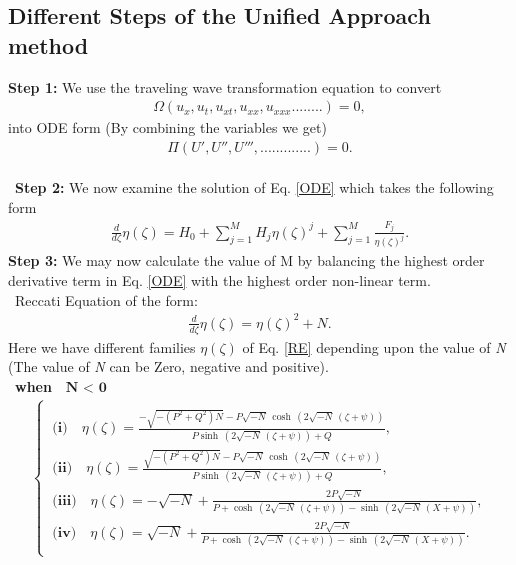 \documentclass{article}
\numberwithin{equation}{section}
\begin{document}
\subsection{Different Steps of the Unified Approach method}
\textbf{Step 1:}
We use the traveling wave transformation equation to convert
\begin{eqnarray}\label{PDE}
\Omega(u_x,u_t,u_{xt},u_{xx},u_{xxx}........)=0,
\end{eqnarray}
into ODE form (By combining the variables we get)
\begin{eqnarray}\label{ODE}
\Pi(U',U'',U''',.............)=0.
\end{eqnarray}\\\
\textbf{Step 2:}
 We now examine the solution of Eq. \ref{ODE} which takes the following form
\begin{eqnarray}\label{TF}
\frac{d}{d \zeta}\eta \! \left(\zeta \right) =H_{0}+ \sum_{j=1}^M H_{j}\eta \left(\zeta \right)^{j}+\sum_{j=1}^M \frac{F_{j}}{\eta \left(\zeta \right)^{j}}.
\end{eqnarray}
\textbf{Step 3:}
We may now calculate the value of M by balancing the highest order derivative term in Eq. \ref{ODE} with the highest order non-linear term.\\\
Reccati Equation of the form:
\begin{eqnarray}\label{RE}
\frac{d}{d \zeta}\eta \! \left(\zeta \right) =\eta \! \left(\zeta \right)^{2}+N.
\end{eqnarray}
Here we have different families ${\eta(\zeta)}$ of Eq. \ref{RE} depending upon the value of \emph{N} (The value of \emph{N} can be Zero, negative and positive). \\\
\textbf{when $\textbf{ N $<$ 0} $ }
\begin{align}\label{FAM1}
\begin{cases}\\\
\textbf{(i)}\quad \eta \! \left(\zeta \right) =\frac{-\sqrt{-\left(P^{2}+Q^{2}\right) N}-P \sqrt{-N}\, \cosh \, \left(2 \sqrt{-N}\, \left(\zeta +\psi \right)\right)}{P \sinh \, \left(2 \sqrt{-N}\, \left(\zeta +\psi \right)\right)+Q},\\\
\textbf{(ii)}\quad \eta \! \left(\zeta \right) =\frac{\sqrt{-\left(P^{2}+Q^{2}\right) N}-P \sqrt{-N}\, \cosh \, \left(2 \sqrt{-N}\, \left(\zeta +\psi \right)\right)}{P \sinh \, \left(2 \sqrt{-N}\, \left(\zeta +\psi \right)\right)+Q},\\\
\textbf{(iii)}\quad \eta \! \left(\zeta \right) =-\sqrt{-N}+\frac{2 P \sqrt{-N}}{P +\cosh \, \left(2 \sqrt{-N}\, \left(\zeta +\psi \right)\right)-\sinh \, \left(2 \sqrt{-N}\, \left(X +\psi \right)\right)},\\\
\textbf{(iv)}\quad \eta \! \left(\zeta \right) =\sqrt{-N}+\frac{2 P \sqrt{-N}}{P +\cosh \, \left(2 \sqrt{-N}\, \left(\zeta +\psi \right)\right)-\sinh \, \left(2 \sqrt{-N}\, \left(X +\psi \right)\right)}.\\\
\end{cases}
\end{align}
\end{document}
